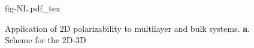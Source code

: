
\begin{figure}[!htbp]
\centering
{fig-NL.pdf_tex}
  \caption{\label{fig:diel-NL}  %
    Application of 2D polarizability to
    multilayer and bulk systems.
    \textbf{a}. Scheme for the 2D-3D}

\end{figure}

